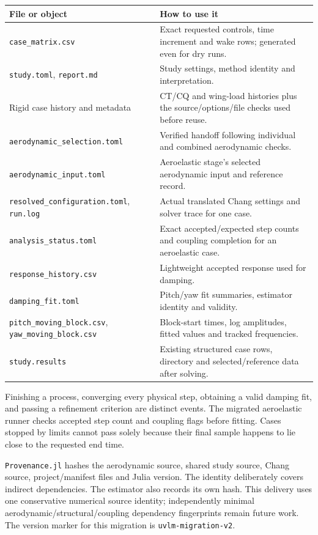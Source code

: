 \documentclass[11pt,a4paper]{article}
\newcommand{\code}{\nolinkurl}
\begin{document}
\begin{longtable}{@{}L{.37\linewidth}L{.55\linewidth}@{}}
\toprule File or object & How to use it\\\midrule\endhead
\code{case_matrix.csv} & Exact requested controls, time increment and wake rows; generated even for dry runs.\\
\code{study.toml}, \code{report.md} & Study settings, method identity and interpretation.\\
Rigid case history and metadata & CT/CQ and wing-load histories plus the source/options/file checks used before reuse.\\
\code{aerodynamic_selection.toml} & Verified handoff following individual and combined aerodynamic checks.\\
\code{aerodynamic_input.toml} & Aeroelastic stage's selected aerodynamic input and reference record.\\
\code{resolved_configuration.toml}, \code{run.log} & Actual translated Chang settings and solver trace for one case.\\
\code{analysis_status.toml} & Exact accepted/expected step counts and coupling completion for an aeroelastic case.\\
\code{response_history.csv} & Lightweight accepted response used for damping.\\
\code{damping_fit.toml} & Pitch/yaw fit summaries, estimator identity and validity.\\
\code{pitch_moving_block.csv}, \code{yaw_moving_block.csv} & Block-start times, log amplitudes, fitted values and tracked frequencies.\\
\code{study.results} & Existing structured case rows, directory and selected/reference data after solving.\\
\bottomrule
\end{longtable}

Finishing a process, converging every physical step, obtaining a valid damping
fit, and passing a refinement criterion are distinct events. The migrated
aeroelastic runner checks accepted step count and coupling flags before fitting.
Cases stopped by limits cannot pass solely because their final sample happens
to lie close to the requested end time.

\code{Provenance.jl} hashes the aerodynamic source, shared study source, Chang
source, project/manifest files and Julia version. The identity deliberately
covers indirect dependencies. The estimator also records its own hash.
This delivery uses one conservative numerical source identity; independently
minimal aerodynamic/structural/coupling dependency fingerprints remain future
work. The version marker for this migration is \code{uvlm-migration-v2}.
\end{document}
